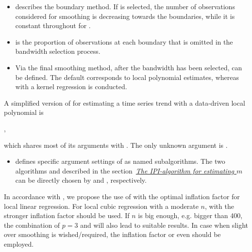 \begin{itemize}
	\item {} describes the boundary method. If  is selected, the number of observations considered for smoothing is decreasing towards the boundaries, while it is constant throughout for .
	\item {} is the proportion of observations at each boundary that is omitted in the bandwidth selection process.
	\item Via  the final smoothing method, after the bandwidth has been selected, can be defined. The default  corresponds to local polynomial estimates, whereas with  a kernel regression is conducted.
\end{itemize}

A simplified version of  for estimating a time series trend with a data-driven local polynomial is
\vspace{-2mm}
\begin{center}
,
\end{center}
\vspace{-2mm}
\noindent
which shares most of its arguments with . The only unknown argument is .
\begin{itemize}
	\item {} defines specific argument settings of  as named subalgorithms. The two algorithms  and  described in the section~\hyperref[sec:trendEst]{\emph{The IPI-algorithm for estimating $m$}} can be directly chosen by  and , respectively. 
\end{itemize}
In accordance with \citet{fenggriesfritz2020}, we propose the use of  with the optimal inflation factor for local linear regression. For local cubic regression with a moderate $n$,  with the stronger inflation factor should be used. If $n$ is big enough, e.g. bigger than 400, the combination of $p = 3$ and  will also lead to suitable results. In case when slight over smoothing is wished/required, the inflation factor  or even  should be employed. 
 
